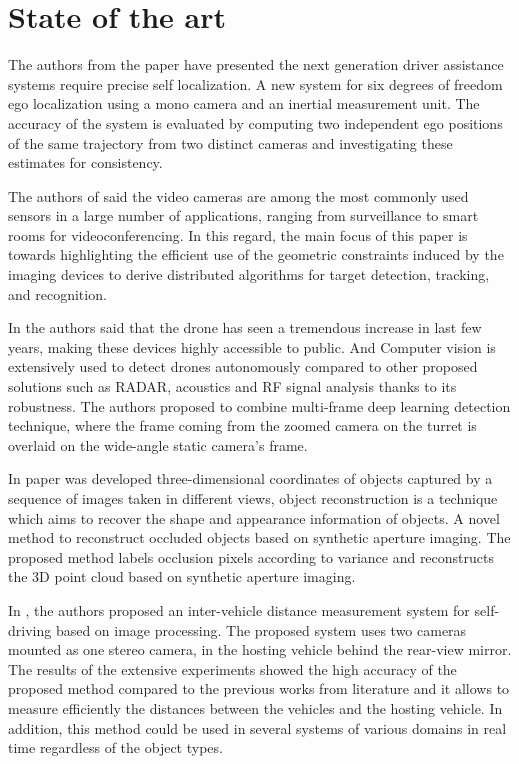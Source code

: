 \chapter{State of the art} \label{capitulo2}

The authors from the paper \cite{Lategahn2013} have presented the next generation driver assistance systems require precise self localization. A new  system for six degrees of freedom ego localization using a mono camera and an inertial measurement unit. The accuracy of the system is evaluated by computing two independent ego positions of the same trajectory from two distinct cameras and investigating these estimates for consistency.

The authors of  \cite{Sankaranarayanan2008} said the video cameras are among the most commonly used sensors in a large number of applications, ranging from surveillance to smart rooms for videoconferencing. In this regard, the main focus of this paper is towards highlighting the efficient use of the geometric constraints induced by the imaging devices to derive distributed algorithms for target detection, tracking, and recognition.


In \cite{Unlu2019} the authors said that the drone has seen a tremendous increase in last few years, making these devices highly accessible to public. And Computer vision is extensively used to detect drones autonomously compared to other proposed solutions such as RADAR, acoustics and RF signal analysis thanks to its robustness. The authors proposed to combine multi-frame deep learning detection technique, where the frame coming from the zoomed camera on the turret is overlaid on the wide-angle static camera’s frame.


In paper \cite{Pei2019} was developed three-dimensional coordinates of objects captured by a sequence of images taken in different views, object reconstruction is a technique which aims to recover the shape and appearance information of objects.  A novel method to reconstruct occluded objects based on synthetic aperture imaging. The proposed method labels occlusion pixels according to variance and reconstructs the 3D point cloud based on synthetic aperture imaging.


In \cite{Zaarane2020}, the authors proposed an inter-vehicle distance measurement system for self-driving based on image processing. The proposed system uses two cameras mounted as one stereo camera, in the hosting vehicle behind the rear-view mirror. The results of the extensive experiments showed the high accuracy of the proposed method compared to the previous works from literature and it allows to measure efficiently the distances between the vehicles and the hosting vehicle. In addition, this method could be used in several systems of various domains in real time regardless of the object types.

